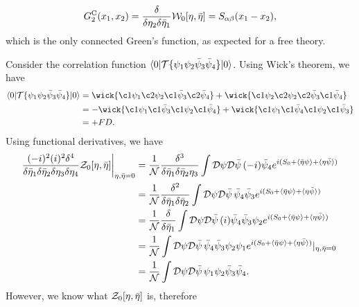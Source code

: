 \begin{equation}
    G_2^{\mathrm{C}}(x_1,x_2) = \frac{\delta}{\delta\eta_2\delta\bar{\eta}_1}\mathcal{W}_0[\eta,\bar{\eta}] = S_{\alpha\beta}(x_1 - x_2),
\end{equation}
which is the only connected Green's function, as expected for a free theory. 
\begin{ex}
    Consider the correlation function $\langle 0 | \mathcal{T}{\{\psi_1\psi_2\bar{\psi}_3\bar{\psi}_4\}} | 0 \rangle$. Using Wick's theorem, we have 
    \begin{equation}
        \begin{split}
            \mybrakett{0}{\TO{\psi_1\psi_2\b{\psi}_3\b{\psi}_4}}{0} &= \wick{\c1 \psi_1 \c2 \psi_2 \c1 {\b{\psi}_3} \c2 {\b{\psi}_4}} + \wick{\c1 \psi_2 \c2 \psi_2 \c2 {\b{\psi}_3} \c1 {\b{\psi}_4}} \\
            &= -\wick{\c1 \psi_1 \c1 {\b{\psi}_3} \c1 \psi_2 \c1 {\b{\psi}_4}} + \wick{\c1 \psi_1 \c1 {\b{\psi}_4} \c1 \psi_2 \c1 {\b{\psi}_3}} \\
            &= +FD.
        \end{split}
    \end{equation}
    Using functional derivatives, we have 
    \begin{equation}
        \begin{split}
            \frac{(-i)^2(i)^2\delta^4}{\delta\bar{\eta}_1\delta\bar{\eta}_2\delta\eta_3\delta\eta_4}\mathcal{Z}_0[\eta,\bar{\eta}]\bigg|_{\eta,\bar{\eta}=0} &= \frac{1}{\mathcal{N}}\frac{\delta^3}{\delta\bar{\eta}_1\delta\bar{\eta}_2\eta_3}\int \mathcal{D}\psi\mathcal{D}\bar{\psi}\,(-i)\bar{\psi}_4e^{i(S_0 + \langle \bar{\eta}\psi \rangle + \langle \eta\bar{\psi} \rangle)} \\
            &= \frac{1}{\mathcal{N}}\frac{\delta^2}{\delta\bar{\eta}_1\delta\bar{\eta}_2}\int \mathcal{D}\psi\mathcal{D}\bar{\psi}\,\bar{\psi}_4\bar{\psi}_3e^{i(S_0 + \langle \bar{\eta}\psi \rangle + \langle \eta\bar{\psi} \rangle)} \\
            &= \frac{1}{\mathcal{N}}\frac{\delta}{\delta\bar{\eta}_1}\int \mathcal{D}\psi\mathcal{D}\bar{\psi}\,(i)\bar{\psi}_4\bar{\psi}_3\psi_2e^{i(S_0 + \langle \bar{\eta}\psi \rangle + \langle \eta\bar{\psi} \rangle)} \\
            &= \frac{1}{\mathcal{N}}\int \mathcal{D}\psi\mathcal{D}\bar{\psi}\,\bar{\psi}_4\bar{\psi}_3\psi_2\psi_1e^{i(S_0 + \langle \bar{\eta}\psi \rangle + \langle \eta\bar{\psi} \rangle)}|_{\eta,\bar{\eta}=0} \\
            &= \frac{1}{\mathcal{N}}\int \mathcal{D}\psi\mathcal{D}\bar{\psi}\,\psi_1\psi_2\bar{\psi}_3\bar{\psi}_4.
        \end{split}
    \end{equation}
    However, we know what $\mathcal{Z}_0[\eta,\bar{\eta}]$ is, therefore 

\end{ex}
